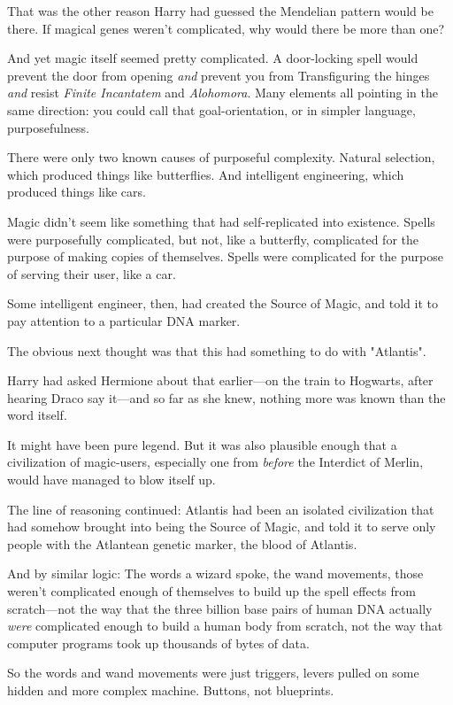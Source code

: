 That was the other reason Harry had guessed the Mendelian pattern would be
there. If magical genes weren't complicated, why would there be more than one?

And yet magic itself seemed pretty complicated. A door-locking spell would
prevent the door from opening \emph{and} prevent you from Transfiguring the
hinges \emph{and} resist \emph{Finite Incantatem} and \emph{Alohomora}. Many
elements all pointing in the same direction: you could call that
goal-orientation, or in simpler language, purposefulness.

There were only two known causes of purposeful complexity. Natural selection,
which produced things like butterflies. And intelligent engineering, which
produced things like cars.

Magic didn't seem like something that had self-replicated into existence.
Spells were purposefully complicated, but not, like a butterfly, complicated
for the purpose of making copies of themselves. Spells were complicated for the
purpose of serving their user, like a car.

Some intelligent engineer, then, had created the Source of Magic, and told it
to pay attention to a particular DNA marker.

The obvious next thought was that this had something to do with "Atlantis".

Harry had asked Hermione about that earlier---on the train to Hogwarts, after
hearing Draco say it---and so far as she knew, nothing more was known than the
word itself.

It might have been pure legend. But it was also plausible enough that a
civilization of magic-users, especially one from \emph{before} the Interdict of
Merlin, would have managed to blow itself up.

The line of reasoning continued: Atlantis had been an isolated civilization
that had somehow brought into being the Source of Magic, and told it to serve
only people with the Atlantean genetic marker, the blood of Atlantis.

And by similar logic: The words a wizard spoke, the wand movements, those
weren't complicated enough of themselves to build up the spell effects from
scratch---not the way that the three billion base pairs of human DNA actually
\emph{were} complicated enough to build a human body from scratch, not the way
that computer programs took up thousands of bytes of data.

So the words and wand movements were just triggers, levers pulled on some
hidden and more complex machine. Buttons, not blueprints.

